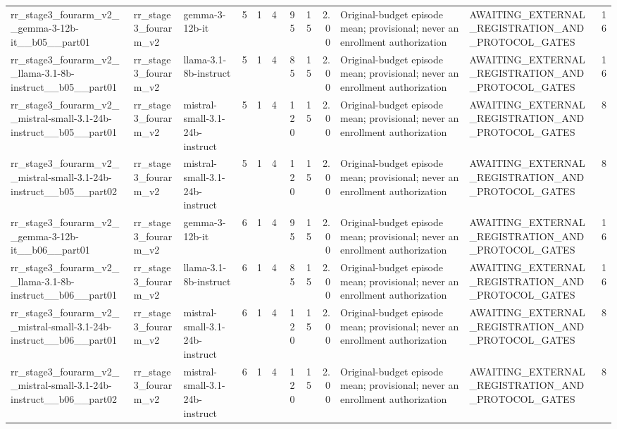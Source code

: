 \begin{tabular}{lllrrrrrrllr}
rr\_stage3\_fourarm\_v2\_\_gemma-3-12b-it\_\_b05\_\_part01 & rr\_stage3\_fourarm\_v2 & gemma-3-12b-it & 5 & 1 & 4 & 95 & 15 & 2.00 & Original-budget episode mean; provisional; never an enrollment authorization & AWAITING\_EXTERNAL\_REGISTRATION\_AND\_PROTOCOL\_GATES & 16 \\
rr\_stage3\_fourarm\_v2\_\_llama-3.1-8b-instruct\_\_b05\_\_part01 & rr\_stage3\_fourarm\_v2 & llama-3.1-8b-instruct & 5 & 1 & 4 & 85 & 15 & 2.00 & Original-budget episode mean; provisional; never an enrollment authorization & AWAITING\_EXTERNAL\_REGISTRATION\_AND\_PROTOCOL\_GATES & 16 \\
rr\_stage3\_fourarm\_v2\_\_mistral-small-3.1-24b-instruct\_\_b05\_\_part01 & rr\_stage3\_fourarm\_v2 & mistral-small-3.1-24b-instruct & 5 & 1 & 4 & 120 & 15 & 2.00 & Original-budget episode mean; provisional; never an enrollment authorization & AWAITING\_EXTERNAL\_REGISTRATION\_AND\_PROTOCOL\_GATES & 8 \\
rr\_stage3\_fourarm\_v2\_\_mistral-small-3.1-24b-instruct\_\_b05\_\_part02 & rr\_stage3\_fourarm\_v2 & mistral-small-3.1-24b-instruct & 5 & 1 & 4 & 120 & 15 & 2.00 & Original-budget episode mean; provisional; never an enrollment authorization & AWAITING\_EXTERNAL\_REGISTRATION\_AND\_PROTOCOL\_GATES & 8 \\
rr\_stage3\_fourarm\_v2\_\_gemma-3-12b-it\_\_b06\_\_part01 & rr\_stage3\_fourarm\_v2 & gemma-3-12b-it & 6 & 1 & 4 & 95 & 15 & 2.00 & Original-budget episode mean; provisional; never an enrollment authorization & AWAITING\_EXTERNAL\_REGISTRATION\_AND\_PROTOCOL\_GATES & 16 \\
rr\_stage3\_fourarm\_v2\_\_llama-3.1-8b-instruct\_\_b06\_\_part01 & rr\_stage3\_fourarm\_v2 & llama-3.1-8b-instruct & 6 & 1 & 4 & 85 & 15 & 2.00 & Original-budget episode mean; provisional; never an enrollment authorization & AWAITING\_EXTERNAL\_REGISTRATION\_AND\_PROTOCOL\_GATES & 16 \\
rr\_stage3\_fourarm\_v2\_\_mistral-small-3.1-24b-instruct\_\_b06\_\_part01 & rr\_stage3\_fourarm\_v2 & mistral-small-3.1-24b-instruct & 6 & 1 & 4 & 120 & 15 & 2.00 & Original-budget episode mean; provisional; never an enrollment authorization & AWAITING\_EXTERNAL\_REGISTRATION\_AND\_PROTOCOL\_GATES & 8 \\
rr\_stage3\_fourarm\_v2\_\_mistral-small-3.1-24b-instruct\_\_b06\_\_part02 & rr\_stage3\_fourarm\_v2 & mistral-small-3.1-24b-instruct & 6 & 1 & 4 & 120 & 15 & 2.00 & Original-budget episode mean; provisional; never an enrollment authorization & AWAITING\_EXTERNAL\_REGISTRATION\_AND\_PROTOCOL\_GATES & 8 \\

\end{tabular}
